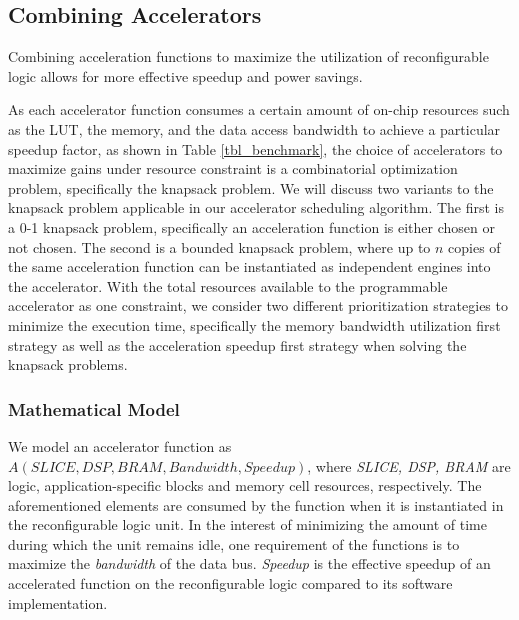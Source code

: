 \subsection{Combining Accelerators}
\label{subsec_combo}



Combining acceleration functions to maximize the utilization of reconfigurable logic
allows for more effective speedup and power savings.

As each accelerator function consumes a certain amount of
on-chip resources such as the LUT, the memory, and the data access
bandwidth to achieve a particular speedup factor, as shown in Table
\ref{tbl_benchmark}, the choice of accelerators to maximize gains
under resource constraint is a combinatorial optimization problem, specifically the knapsack problem. 
We will discuss two variants to the knapsack problem
applicable in our accelerator scheduling algorithm.
The first is a 0-1 knapsack problem, specifically an acceleration function is either chosen or not
chosen.
The second is a bounded knapsack problem, where up to $n$ copies of
the same acceleration function can be instantiated as independent
engines into the accelerator. 
With the total resources available to the programmable accelerator as
one constraint, we consider two different prioritization strategies to minimize the
execution time, specifically the memory bandwidth utilization first strategy as well as the acceleration
speedup first strategy when solving the knapsack problems.

\subsubsection{Mathematical Model}

We model an accelerator function as $A(SLICE, DSP, BRAM, Bandwidth, Speedup)$,
where {\em SLICE, DSP, BRAM} are logic, application-specific blocks and
memory cell resources, respectively.  The aforementioned elements are consumed by the function when it is
instantiated in the reconfigurable logic unit. In the interest of minimizing the amount of time during which the unit remains idle, one
 requirement of the functions is to maximize the {\em bandwidth} of the data bus. {\em Speedup} is the effective speedup of an accelerated function on the reconfigurable logic compared to its software implementation. 

